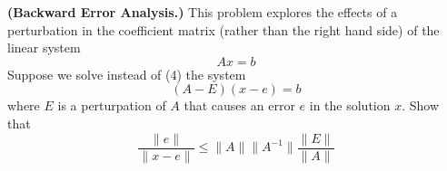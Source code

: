 \textbf{(Backward Error Analysis.)} This problem explores the effects
of a perturbation in the coefficient matrix (rather than the right
hand side) of the linear system \[Ax=b\] Suppose we solve instead of
(4) the system \[(A - E)(x - e) = b\] where $E$ is a perturpation of
$A$ that causes an error $e$ in the solution $x$. Show that \[
\frac{\|e\|}{\| x - e \|} \le \|A\| \|A^{-1}\| \frac{\| E \|}{\| A \|}
\]

{\color{blue}


}
